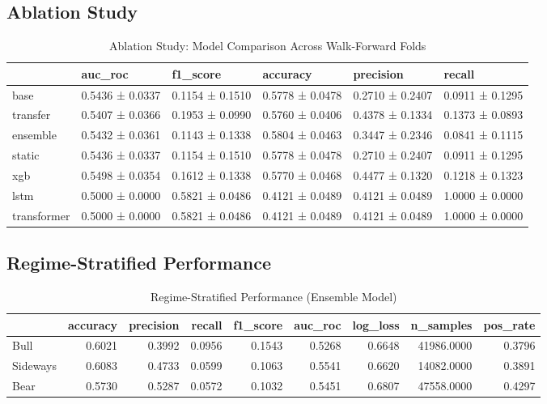 \documentclass[12pt,a4paper]{article}
\begin{document}
\subsection{Ablation Study}

\begin{table}
\caption{Ablation Study: Model Comparison Across Walk-Forward Folds}
\label{tab:ablation}
\begin{tabular}{llllll}
\toprule
 & auc_roc & f1_score & accuracy & precision & recall \\
\midrule
base & 0.5436 ± 0.0337 & 0.1154 ± 0.1510 & 0.5778 ± 0.0478 & 0.2710 ± 0.2407 & 0.0911 ± 0.1295 \\
transfer & 0.5407 ± 0.0366 & 0.1953 ± 0.0990 & 0.5760 ± 0.0406 & 0.4378 ± 0.1334 & 0.1373 ± 0.0893 \\
ensemble & 0.5432 ± 0.0361 & 0.1143 ± 0.1338 & 0.5804 ± 0.0463 & 0.3447 ± 0.2346 & 0.0841 ± 0.1115 \\
static & 0.5436 ± 0.0337 & 0.1154 ± 0.1510 & 0.5778 ± 0.0478 & 0.2710 ± 0.2407 & 0.0911 ± 0.1295 \\
xgb & 0.5498 ± 0.0354 & 0.1612 ± 0.1338 & 0.5770 ± 0.0468 & 0.4477 ± 0.1320 & 0.1218 ± 0.1323 \\
lstm & 0.5000 ± 0.0000 & 0.5821 ± 0.0486 & 0.4121 ± 0.0489 & 0.4121 ± 0.0489 & 1.0000 ± 0.0000 \\
transformer & 0.5000 ± 0.0000 & 0.5821 ± 0.0486 & 0.4121 ± 0.0489 & 0.4121 ± 0.0489 & 1.0000 ± 0.0000 \\
\bottomrule
\end{tabular}
\end{table}


\subsection{Regime-Stratified Performance}

\begin{table}
\caption{Regime-Stratified Performance (Ensemble Model)}
\label{tab:regime}
\begin{tabular}{lrrrrrrrr}
\toprule
 & accuracy & precision & recall & f1_score & auc_roc & log_loss & n_samples & pos_rate \\
\midrule
Bull & 0.6021 & 0.3992 & 0.0956 & 0.1543 & 0.5268 & 0.6648 & 41986.0000 & 0.3796 \\
Sideways & 0.6083 & 0.4733 & 0.0599 & 0.1063 & 0.5541 & 0.6620 & 14082.0000 & 0.3891 \\
Bear & 0.5730 & 0.5287 & 0.0572 & 0.1032 & 0.5451 & 0.6807 & 47558.0000 & 0.4297 \\
\bottomrule
\end{tabular}
\end{table}
\end{document}
